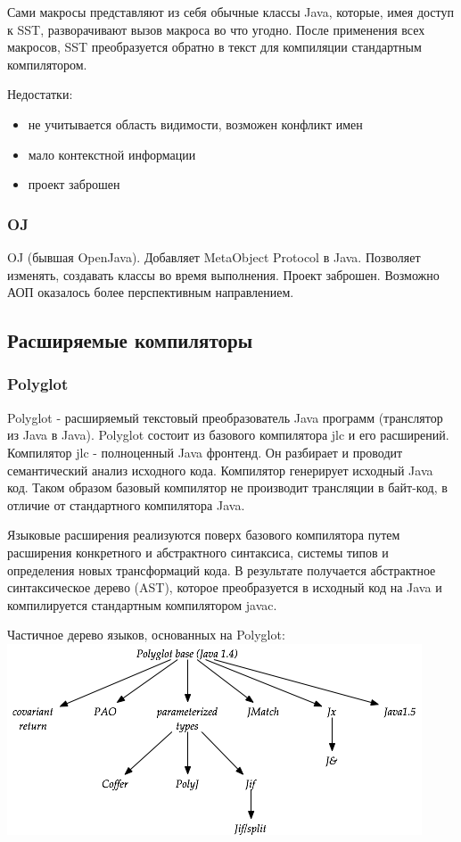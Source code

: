 \documentclass[a4paper,12pt]{article}
\begin{document}
Сами макросы представляют из себя обычные классы Java, которые, имея доступ к
SST, разворачивают вызов макроса во что угодно. После применения всех макросов,
SST преобразуется обратно в текст для компиляции стандартным компилятором.

Недостатки:
\begin{itemize}
 \item не учитывается область видимости, возможен конфликт имен
 \item мало контекстной информации
 \item проект заброшен
\end{itemize}

\subsubsection{OJ}
OJ (бывшая OpenJava). Добавляет MetaObject Protocol в Java.
Позволяет изменять, создавать классы во время выполнения.
Проект заброшен. Возможно АОП оказалось более перспективным направлением.

\subsection{Расширяемые компиляторы}
\subsubsection{Polyglot}
Polyglot - расширяемый текстовый преобразователь Java программ (транслятор из
Java в Java). Polyglot состоит из базового компилятора jlc и его расширений.
Компилятор jlc - полноценный Java фронтенд. Он разбирает и проводит
семантический анализ исходного кода. Компилятор генерирует исходный Java код.
Таком образом базовый компилятор не производит трансляции в байт-код, в отличие
от стандартного компилятора Java.

Языковые расширения реализуются поверх базового компилятора путем расширения
конкретного и абстрактного синтаксиса, системы типов и определения новых
трансформаций кода. В результате получается абстрактное синтаксическое дерево
(AST), которое преобразуется в исходный код на Java и компилируется стандартным
компилятором javac.

\begin{center}
Частичное дерево языков, основанных на Polyglot:
 \includegraphics[scale=0.6]{img/polyglot-tree.png}
\end{center}
\end{document}
